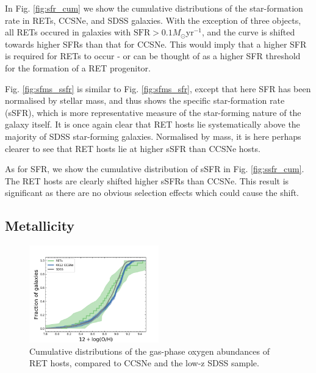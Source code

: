 \documentclass[fleqn,usenatbib,]{mnras}
\newcommand{\msun}[0]{M_{\odot}}
\begin{document}
In Fig. \ref{fig:sfr_cum} we show the cumulative distributions of the star-formation rate in RETs, CCSNe, and SDSS galaxies. With the exception of three objects, all RETs occured in galaxies with $\textrm{SFR}>0.1 \msun$yr$^{-1}$, and the curve is shifted towards higher SFRs than that for CCSNe. This would imply that a higher SFR is required for RETs to occur - or can be thought of as a higher SFR threshold for the formation of a RET progenitor.

Fig. \ref{fig:sfms_ssfr} is similar to Fig. \ref{fig:sfms_sfr}, except that here SFR has been normalised by stellar mass, and thus shows the specific star-formation rate (sSFR), which is more representative measure of the star-forming nature of the galaxy itself. It is once again clear that RET hosts lie systematically above the majority of SDSS star-forming galaxies. Normalised by mass, it is here perhaps clearer to see that RET hosts lie at higher sSFR than CCSNe hosts.

As for SFR, we show the cumulative distribution of sSFR in Fig. \ref{fig:ssfr_cum}. The RET hosts are clearly shifted higher sSFRs than CCSNe. This result is significant as there are no obvious selection effects which could cause the shift.

\subsection{Metallicity \label{subsec:res_metallicity}}
\begin{figure}
\includegraphics[width=0.5\textwidth]{figs/RET_OH_cum.png}
\caption{Cumulative distributions of the gas-phase oxygen abundances of RET hosts, compared to CCSNe and the low-z SDSS sample.
\label{fig:oh_cum}}
\end{figure}
\end{document}
